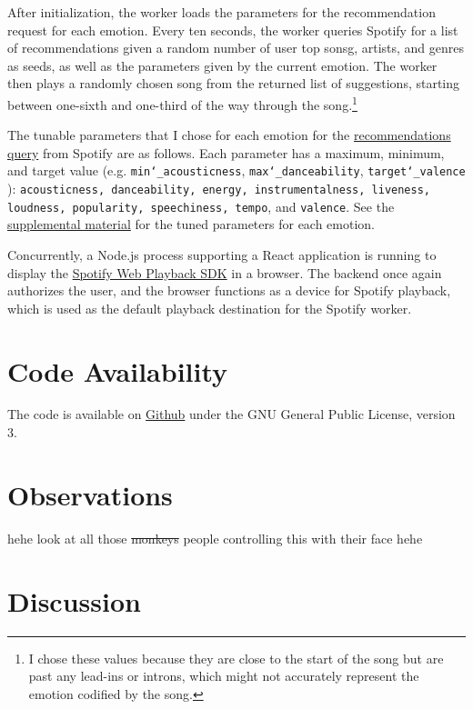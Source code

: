 \documentclass{article}
\renewcommand{\_}[1]{\underline{ #1 }}
\theoremstyle{definition}
\begin{document}
After initialization, the worker loads the parameters for the recommendation request for each emotion. Every ten seconds, the worker queries Spotify for a list of recommendations given a random number of user top sonsg, artists, and genres as seeds, as well as the parameters given by the current emotion. The worker then plays a randomly chosen song from the returned list of suggestions, starting between one-sixth and one-third of the way through the song.\footnote{I chose these values because they are close to the start of the song but are past any lead-ins or introns, which might not accurately represent the emotion codified by the song.} 

The tunable parameters that I chose for each emotion for the \href{https://developer.spotify.com/documentation/web-api/reference/#/operations/get-recommendationsrecommendation}{recommendations query} from Spotify are as follows. Each parameter has a maximum, minimum, and target value (e.g. \texttt{min\char`_acousticness}, \texttt{max\char`_danceability}, \texttt{target\char`_valence} ): \texttt{acousticness, danceability, energy, instrumentalness, liveness, loudness, popularity, speechiness, tempo}, and \texttt{valence}. See the \hyperref[Code Parameters]{supplemental material} for the tuned parameters for each emotion.

Concurrently, a Node.js process supporting a React application is running to display the \href{https://developer.spotify.com/documentation/web-playback-sdk/}{Spotify Web Playback SDK} in a browser. The backend once again authorizes the user, and the browser functions as a device for Spotify playback, which is used as the default playback destination for the Spotify worker. 

\section[Code Availability]{Code Availability}

The code is available on \href{https://github.com/as4mo3/face-the-music/}{Github} under the GNU General Public License, version 3. 

\section[Observations]{Observations}
\label{Observations}

hehe look at all those \sout{monkeys} people controlling this with their face hehe

\section[Discussion]{Discussion}
\label{Discussion}
\end{document}
